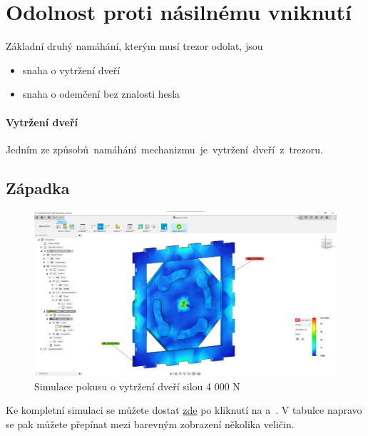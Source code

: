 \section{Odolnost proti násilnému vniknutí}
Základní druhý namáhání, kterým musí trezor odolat, jsou

\begin{itemize}
    \item snaha o vytržení dveří 
    \item snaha o odemčení bez znalosti hesla
\end{itemize}

\paragraph{Vytržení dveří}
Jedním ze způsobů~namáhání~mechanizmu~je~vytržení~dveří~z~trezoru.

\subsection{Západka}

\begin{figure}[htbp]
    \centering
    \includegraphics[width=\textwidth]{kapitoly/obrazky/M3/simulace/odolnost_proti_vytrzeni_4kN.png}
    \caption{Simulace pokusu o vytržení dveří silou 4 000 N}
    \label{fig:M3-simulace-vytrzeni}
\end{figure}
Ke kompletní simulaci se můžete dostat \href{https://myhub.autodesk360.com/ue2d7aa41/g/shares/SH56a43QTfd62c1cd96843f1e03a0eb48053?viewState=NoIgbgDAdAjCA0IDeAdEAXAngBwKZoC40BlASwFsBXAGwEN1SB7AOzXjVoGdPd1C0ARjABsATlEQItALQBjcbmkAWCMIjSBuWgA5lAM22ilAVgAmMAOyy9\%2BBGkYCAVrlnoAkqcIBmAL4gAukA}{zde}
po kliknutí na  a~. V tabulce napravo se pak můžete přepínat mezi barevným zobrazení několika veličin.

